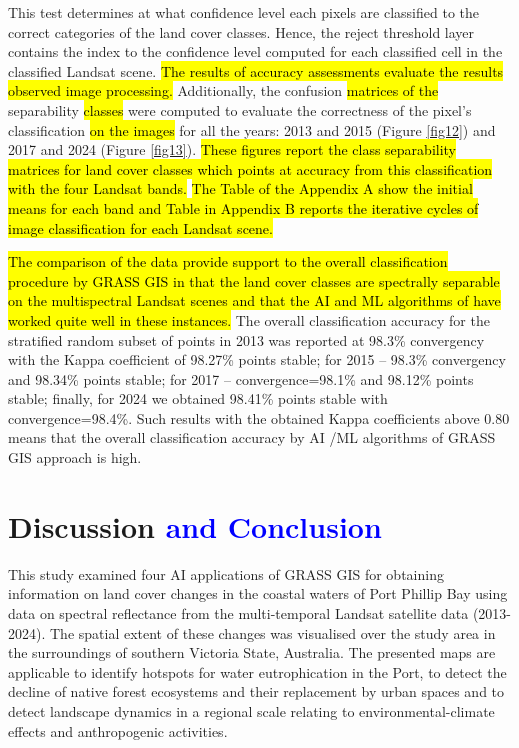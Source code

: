 \documentclass[jmse,article,submit,pdftex,moreauthors]{Definitions/mdpi}
\begin{document}
This test determines at what confidence level each pixels are classified to the correct categories of the land cover classes. Hence, the reject threshold layer contains the index to the  confidence level computed for each classified cell in the classified Landsat scene. \hl{The results of accuracy assessments evaluate the results observed image processing. }Additionally, the confusion \hl{matrices of the }separability \hl{classes} were computed to evaluate the correctness of the pixel's classification \hl{on the images }for all the years: 2013 and 2015 (Figure \ref{fig12}) and 2017 and 2024 (Figure \ref{fig13}). \hl{These figures report the class separability matrices for land cover classes which points at accuracy from this classification with the four Landsat bands.} \hl{The Table of the Appendix A show the initial means for each band and Table in Appendix B reports the iterative cycles of image classification for each Landsat scene.}

\hl{The comparison of the data provide support to the overall classification procedure by GRASS GIS  in that the land cover classes are spectrally separable on the multispectral Landsat scenes and that the AI and ML algorithms of have worked quite well in these instances.} The overall classification accuracy for the stratified random subset of points in 2013 was reported at 98.3\% convergency with the Kappa coefficient of 98.27\% points stable; for 2015 -- 98.3\% convergency and 98.34\% points stable; for 2017 -- convergence=98.1\% and 98.12\% points stable; finally, for 2024 we obtained 98.41\% points stable with convergence=98.4\%. Such results with the obtained Kappa coefficients above 0.80 means that the overall classification accuracy by AI /ML algorithms of GRASS GIS approach is high.

\section{Discussion \textcolor{blue}{and Conclusion}}

This study examined four AI applications of GRASS GIS for obtaining information on land cover changes in the coastal waters of Port Phillip Bay using data on spectral reflectance from the multi-temporal Landsat satellite data (2013-2024). The spatial extent of these changes was visualised over the study area in the surroundings of southern Victoria  State, Australia. The presented maps are applicable to identify hotspots for water eutrophication in the Port, to detect the decline of native forest ecosystems and their replacement by urban spaces and to detect landscape dynamics in a regional scale relating to environmental-climate effects and anthropogenic activities. 
\end{document}
